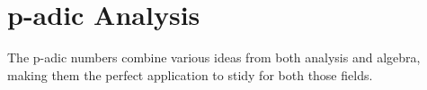 \chapter{p-adic Analysis}

The p-adic numbers combine various ideas from both analysis and algebra, making them the perfect application to stidy for both those fields.
